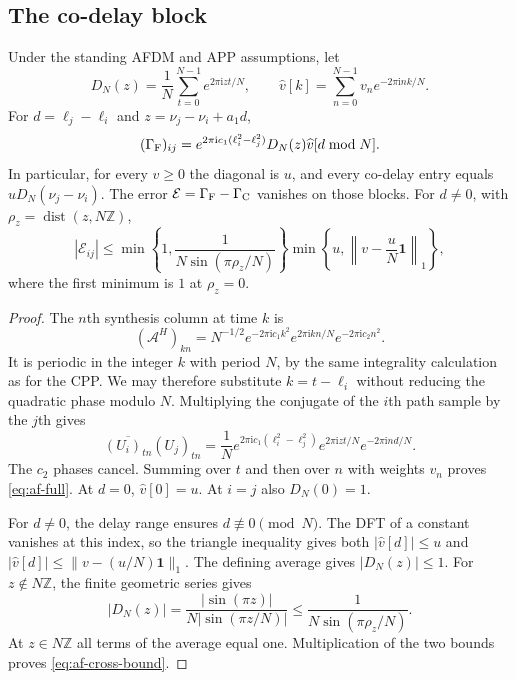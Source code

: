 \subsection{The co-delay block}

\begin{afdmprop}
\label{prop:af-block}
Under the standing AFDM and APP assumptions, let
\[
 D_N(z)=\frac1N\sum_{t=0}^{N-1}e^{2\pi\mathrm{i}zt/N},
 \qquad
 \widehat v[k]=\sum_{n=0}^{N-1}v_ne^{-2\pi\mathrm{i}nk/N}.
\]
For $d=\ell_j-\ell_i$ and $z=\nu_j-\nu_i+a_1d$,
\begin{equation}
 (\Gamma_{\rm F})_{ij}
 =e^{2\pi\mathrm{i}c_1(\ell_i^2-\ell_j^2)}
    D_N(z)\widehat v[d\bmod N].                       \label{eq:af-full}
\end{equation}
In particular, for every $v\ge0$ the diagonal is $u$, and every co-delay
entry equals $uD_N(\nu_j-\nu_i)$. The error
$\mathcal E=\Gamma_{\rm F}-\Gamma_{\rm C}$ vanishes on those blocks. For
$d\ne0$, with $\rho_z=\operatorname{dist}(z,N\mathbb Z)$,
\begin{equation}
 |\mathcal E_{ij}|
 \le
 \min\!\left\{1,\frac{1}{N\sin(\pi\rho_z/N)}\right\}
 \min\!\left\{u,\left\|v-\frac uN\mathbf1\right\|_1\right\},       \label{eq:af-cross-bound}
\end{equation}
where the first minimum is $1$ at $\rho_z=0$.
\end{afdmprop}

\begin{proof}
The $n$th synthesis column at time $k$ is
\[
 (\mathcal A^H)_{kn}
 =N^{-1/2}e^{-2\pi\mathrm{i}c_1k^2}
            e^{2\pi\mathrm{i}kn/N}e^{-2\pi\mathrm{i}c_2n^2}.
\]
It is periodic in the integer $k$ with period $N$, by the same
integrality calculation as for the CPP. We may therefore substitute
$k=t-\ell_i$ without reducing the quadratic phase modulo $N$.
Multiplying the conjugate of the $i$th path sample by the $j$th gives
\[
 \overline{(U_i)_{tn}}(U_j)_{tn}
 =\frac1N e^{2\pi\mathrm{i}c_1(\ell_i^2-\ell_j^2)}
           e^{2\pi\mathrm{i}zt/N}e^{-2\pi\mathrm{i}nd/N}.
\]
The $c_2$ phases cancel. Summing over $t$ and then over $n$ with weights
$v_n$ proves \eqref{eq:af-full}. At $d=0$, $\widehat v[0]=u$.
At $i=j$ also $D_N(0)=1$.

For $d\ne0$, the delay range ensures $d\not\equiv0\pmod N$.
The DFT of a constant vanishes at this index, so the triangle inequality
gives both $|\widehat v[d]|\le u$ and
$|\widehat v[d]|\le\|v-(u/N)\mathbf1\|_1$. The defining average gives
$|D_N(z)|\le1$. For $z\notin N\mathbb Z$, the finite geometric series gives
\[
 |D_N(z)|=\frac{|\sin(\pi z)|}{N|\sin(\pi z/N)|}
 \le\frac1{N\sin(\pi\rho_z/N)} .
\]
At $z\in N\mathbb Z$ all terms of the average equal one. Multiplication
of the two bounds proves \eqref{eq:af-cross-bound}.
\end{proof}

